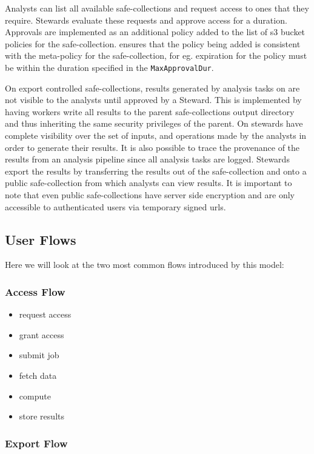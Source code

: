Analysts can list all available safe-collections and request access to ones that they require.
Stewards evaluate these requests and approve access for a duration. Approvals are implemented as an additional
policy added to the list of s3 bucket policies for the safe-collection. \NAME ensures that the policy
being added is consistent with the meta-policy for the safe-collection, for eg. expiration for the policy
must be within the duration specified in the \texttt{MaxApprovalDur}.

On export controlled safe-collections, results generated by analysis tasks on \NAME are not visible to the
analysts until approved by a Steward. This is implemented by having workers write all results to the
parent safe-collections output directory and thus inheriting the same security privileges of the parent.
On \NAME stewards have complete visibility over the set of inputs, and operations made by the analysts
in order to generate their results. It is also possible to trace the provenance of the results from an
analysis pipeline since all analysis tasks are logged.
Stewards export the results by transferring the results out of the safe-collection and onto a public
safe-collection from which analysts can view results. It is important to note that even public
safe-collections have server side encryption and are only accessible to authenticated users via temporary
signed urls.


\subsection{User Flows}

Here we will look at the two most common flows introduced by this model:

\subsubsection{Access Flow}

\begin{itemize}
\item request access
\item grant access
\item submit job
\item fetch data
\item compute
\item store results
\end{itemize}

\subsubsection{Export Flow}

